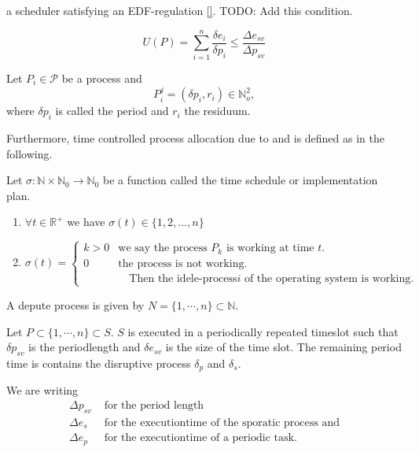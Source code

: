 a scheduler satisfying an EDF-regulation \ref{}. TODO: Add this condition.

\begin{equation}
U(P) = \sum\limits_{i=1}^n \frac{\delta e_i}{\delta p_i} \leq \frac{\Delta e_{sv}}{\Delta p_{sv}}
\end{equation}

\begin{definition}
Let $P_i\in \mathcal{P}$ be a process and 
\begin{equation}
P^j_i = ( \delta p_i, r_i) \in \mathbb{N}_o^2,  
\end{equation}
where $\delta p_i$ is called the period and $r_i$ the residuum. 
\end{definition}
Furthermore, time controlled process allocation due to \cite{B} and \cite[p. 34]{K} is defined as in the following.

\begin{definition}
Let $\sigma: \mathbb{N} \times \mathbb{N}_0 \rightarrow \mathbb{N}_0$ be a function called the time schedule or implementation plan.
\begin{enumerate}
\item $\forall t \in \mathbb{R}^+$ we have $\sigma(t)\in \{1,2,...,n\}$
\item \begin{equation}
		\sigma(t) =
		\begin{cases}
			k > 0 & \text{we say the process $P_k$ is working at time $t$.}\\
			0 & \text{the process is not working.}\\
			  &\quad  \text{Then the idele-process$i$ of the operating system is working.}
		\end{cases}       
\end{equation}
\end{enumerate}
\end{definition}

A depute process is given by $ N = \{1, \cdots, n\}\subset \mathbb{N}$. 

Let $P \subset \{1, \cdots, n\} \subset S$.
$S$ is executed in a periodically repeated timeslot such that $\delta p_{sv}$ is the periodlength and $\delta e_{sv}$ is the size of the time slot.
The remaining period time is contains the  disruptive process $\delta_p$ and $\delta_s$.

We are writing
\begin{align}
	\Delta p_{sv} &\text{ for the period length} \\
	\Delta e_s &\text{ for the executiontime of the sporatic process and}\\ 
	\Delta e_p &\text{ for the executiontime of a periodic task.}
\end{align}

